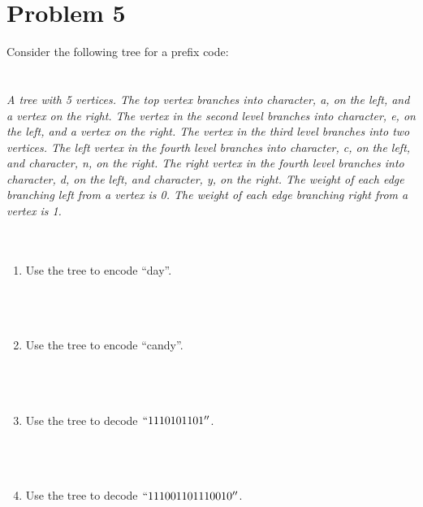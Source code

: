 \documentclass{amsart}
\theoremstyle{definition}
\theoremstyle{Exercise}
\theoremstyle{remark}
\theoremstyle{rule}
\numberwithin{equation}{section}
\begin{document}
\section*{Problem 5}

Consider the following tree for a prefix code:\\
\\\\
{\color{blue}{\bf Figure 13:} \emph{A tree with 5 vertices. The top vertex branches into character, a, on the left, and a vertex on the right. The vertex in the second level branches into character, e, on the left, and a vertex on the right. The vertex in the third level branches into two vertices. The left vertex in the fourth level branches into character, c, on the left, and character, n, on the right. The right vertex in the fourth level branches into character, d, on the left, and character, y, on the right. The weight of each edge branching left from a vertex is 0. The weight of each edge branching right from a vertex is 1.
\\
}
}
\\
\\

\begin{enumerate}[label=(\alph*)]
\item Use the tree to encode ``day''.\\\\
\\\\
\item Use the tree to encode ``candy''.\\\\
\\\\
\item Use the tree to decode $``1110101101''$.\\\\
\\\\
\item Use the tree to decode $``111001101110010''$.\\\\
\\\\

\end{enumerate}
\end{document}
